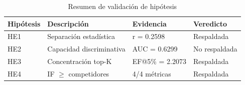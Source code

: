 \begin{table}[htbp]
\centering
\small
\caption{Resumen de validación de hipótesis}
\label{tab:hypothesis-summary}
\begin{tabular}{llll}
\toprule
Hipótesis & Descripción & Evidencia & Veredicto \\
\midrule
  HE1 & Separación estadística & r = 0.2598 & Respaldada \\
  HE2 & Capacidad discriminativa & AUC = 0.6299 & No respaldada \\
  HE3 & Concentración top-K & EF@5\% = 2.2073 & Respaldada \\
  HE4 & IF $\geq$ competidores & 4/4 métricas & Respaldada \\
\bottomrule
\end{tabular}
\end{table}
